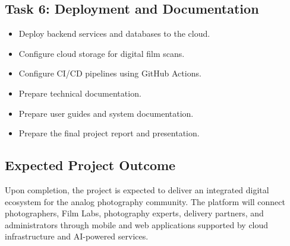 \subsection{Task 6: Deployment and Documentation}

\begin{itemize}
    \item Deploy backend services and databases to the cloud.
    \item Configure cloud storage for digital film scans.
    \item Configure CI/CD pipelines using GitHub Actions.
    \item Prepare technical documentation.
    \item Prepare user guides and system documentation.
    \item Prepare the final project report and presentation.
\end{itemize}

\subsection{Expected Project Outcome}

Upon completion, the project is expected to deliver an integrated digital ecosystem for the analog photography community. The platform will connect photographers, Film Labs, photography experts, delivery partners, and administrators through mobile and web applications supported by cloud infrastructure and AI-powered services.